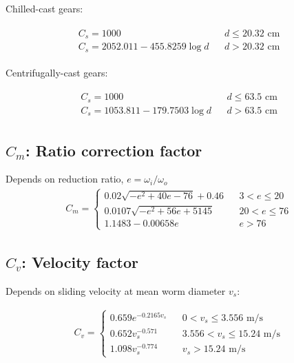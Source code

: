 \documentclass[a4paper,openany,svgnames]{kaobook}
\begin{document}
Chilled-cast gears:

\begin{align*}
  \begin{array}{lll}
    C_{s} = 1000 &  & d \leqslant 20.32 \text{ cm} \\
    C_{s} = 2052.011 - 455.8259 \log d &  & d > 20.32 \text{ cm}
  \end{array}
\end{align*}

Centrifugally-cast gears:

\begin{align*}
  \begin{array}{lll}
    C_{s} = 1000 &  & d \leqslant 63.5 \text{ cm} \\
    C_{s} = 1053.811 - 179.7503 \log d &  & d > 63.5 \text{ cm}
  \end{array}
\end{align*}

\subsection{\(C_{m}\): Ratio correction factor}
\label{sec:orge424676}

Depends on reduction ratio, \(e = \omega_{i}/\omega_{o}\)
\begin{align*}
  C_{m} = \left\{
  \begin{array}{lll}
    0.02 \sqrt{-e^{2} + 40 e - 76} + 0.46 &  & 3 < e \leqslant 20 \\
    0.0107 \sqrt{-e^{2} + 56e + 5145} &  & 20 < e \leqslant 76 \\
    1.1483 - 0.00658e &  & e > 76
  \end{array} \right.
\end{align*}

\subsection{\(C_{v}\): Velocity factor}
\label{sec:org00ca6b6}

Depends on sliding velocity at mean worm diameter \(v_{s}\):

\begin{align*}
  C_{v} = \left\{
  \begin{array}{lll}
    0.659 e^{-0.2165 v_{s}} &  & 0 < v_{s} \leqslant 3.556 \text{ m/s}\\
    0.652 v_{s}^{-0.571} &  & 3.556 < v_{s} \leqslant 15.24 \text{ m/s}\\
    1.098 v_{s}^{-0.774} &  & v_{s} > 15.24 \text{ m/s}
  \end{array} \right.
\end{align*}
\end{document}
